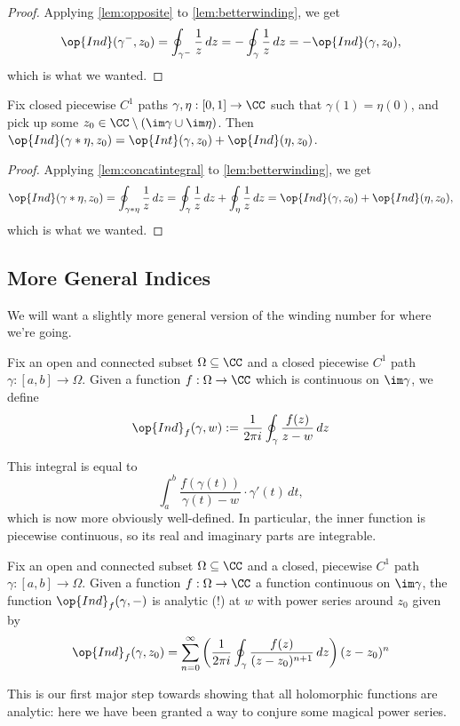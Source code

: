 \begin{proof}
	Applying \autoref{lem:opposite} to \autoref{lem:betterwinding}, we get
	\[\op{Ind}(\gamma^-,z_0)=\oint_{\gamma^-}\frac1z\,dz=-\oint_\gamma\frac1z\,dz=-\op{Ind}(\gamma,z_0),\]
	which is what we wanted.
\end{proof}
\begin{corollary}
	Fix closed piecewise $C^1$ paths $\gamma,\eta:[0,1]\to\CC$ such that $\gamma(1)=\eta(0)$, and pick up some $z_0\in\CC\setminus(\im\gamma\cup\im\eta)$. Then $\op{Ind}(\gamma*\eta,z_0)=\op{Int}(\gamma,z_0)+\op{Ind}(\eta,z_0)$.
\end{corollary}
\begin{proof}
	Applying \autoref{lem:concatintegral} to \autoref{lem:betterwinding}, we get
	\[\op{Ind}(\gamma*\eta,z_0)=\oint_{\gamma*\eta}\frac1z\,dz=\oint_\gamma\frac1z\,dz+\oint_\eta\frac1z\,dz=\op{Ind}(\gamma,z_0)+\op{Ind}(\eta,z_0),\]
	which is what we wanted.
\end{proof}

\subsection{More General Indices}
We will want a slightly more general version of the winding number for where we're going.
\begin{definition}[Index]
	Fix an open and connected subset $\Omega\subseteq\CC$ and a closed piecewise $C^1$ path $\gamma:[a,b]\to\Omega$. Given a function $f:\Omega\to\CC$ which is continuous on $\im\gamma$, we define
	\[\op{Ind}_f(\gamma,w):=\frac1{2\pi i}\oint_\gamma\frac{f(z)}{z-w}\,dz\]
\end{definition}
\begin{remark}
	This integral is equal to
	\[\int_a^b\frac{f(\gamma(t))}{\gamma(t)-w}\cdot\gamma'(t)\,dt,\]
	which is now more obviously well-defined. In particular, the inner function is piecewise continuous, so its real and imaginary parts are integrable.
\end{remark}
\begin{proposition} \label{prop:indexanalytic}
	Fix an open and connected subset $\Omega\subseteq\CC$ and a closed, piecewise $C^1$ path $\gamma:[a,b]\to\Omega$. Given a function $f:\Omega\to\CC$ a function continuous on $\im\gamma$, the function $\op{Ind}_f(\gamma,-)$ is analytic (!) at $w$ with power series around $z_0$ given by
	\[\op{Ind}_f(\gamma,z_0)=\sum_{n=0}^\infty\left(\frac1{2\pi i}\oint_\gamma\frac{f(z)}{(z-z_0)^{n+1}}\,dz\right)(z-z_0)^n\]
\end{proposition}
This is our first major step towards showing that all holomorphic functions are analytic: here we have been granted a way to conjure some magical power series.

